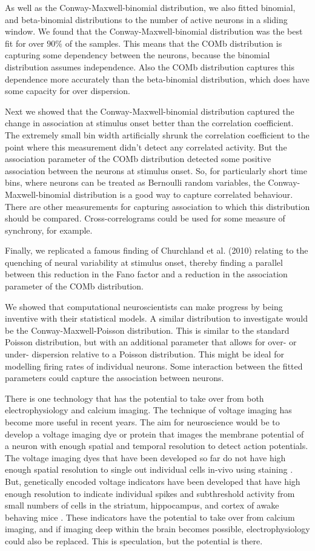 As well as the Conway-Maxwell-binomial distribution, we also fitted binomial, and beta-binomial distributions to the number of active neurons in a sliding window. We found that the Conway-Maxwell-binomial distribution was the best fit for over $90\%$ of the samples. This means that the COMb distribution is capturing some dependency between the neurons, because the binomial distribution assumes independence. Also the COMb distribution captures this dependence more accurately than the beta-binomial distribution, which does have some capacity for over dispersion.

Next we showed that the Conway-Maxwell-binomial distribution captured the change in association at stimulus onset better than the correlation coefficient. The extremely small bin width artificially shrunk the correlation coefficient to the point where this measurement didn't detect any correlated activity. But the association parameter of the COMb distribution detected some positive association between the neurons at stimulus onset. So, for particularly short time bins, where neurons can be treated as Bernoulli random variables, the Conway-Maxwell-binomial distribution is a good way to capture correlated behaviour. There are other measurements for capturing association to which this distribution should be compared. Cross-correlograms could be used for some measure of synchrony, for example.

Finally, we replicated a famous finding of Churchland et al. (2010) relating to the quenching of neural variability at stimulus onset, thereby finding a parallel between this reduction in the Fano factor and a reduction in the association parameter of the COMb distribution.

We showed that computational neuroscientists can make progress by being inventive with their statistical models. A similar distribution to investigate would be the Conway-Maxwell-Poisson distribution. This is similar to the standard Poisson distribution, but with an additional parameter that allows for over- or under- dispersion relative to a Poisson distribution. This might be ideal for modelling firing rates of individual neurons. Some interaction between the fitted parameters could capture the association between neurons.

There is one technology that has the potential to take over from both electrophysiology and calcium imaging. The technique of voltage imaging has become more useful in recent years. The aim for neuroscience would be to develop a voltage imaging dye or protein that images the membrane potential of a neuron with enough spatial and temporal resolution to detect action potentials. The voltage imaging dyes that have been developed so far do not have high enough spatial resolution to single out individual cells in-vivo using staining \parencite{bando}. But, genetically encoded voltage indicators have been developed that have high enough resolution to indicate individual spikes and subthreshold activity from small numbers of cells in the striatum, hippocampus, and cortex of awake behaving mice \parencite{piatkevich}. These indicators have the potential to take over from calcium imaging, and if imaging deep within the brain becomes possible, electrophysiology could also be replaced. This is speculation, but the potential is there.
